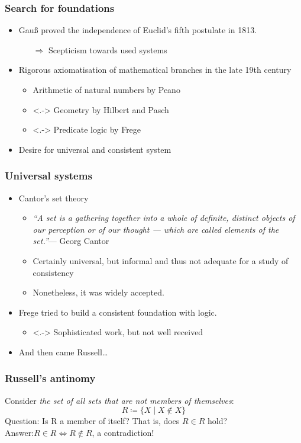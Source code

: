 \documentclass{beamer}
\begin{document}
\begin{frame}
    \frametitle{Search for foundations}
    \begin{itemize}[<+->]
	\item Gauß proved the independence of Euclid's fifth postulate in 1813.
	\begin{itemize}
		\item[$\Rightarrow$] Scepticism towards used systems
	\end{itemize}
	\item Rigorous axiomatisation of mathematical branches in the late 19th century
	\begin{itemize}
		\item Arithmetic of natural numbers by Peano
		\item<.-> Geometry by Hilbert and Pasch
		\item<.-> Predicate logic by Frege
	\end{itemize}
	\item Desire for universal and consistent system
    \end{itemize}
\end{frame}
\begin{frame}
    \frametitle{Universal systems}
    \begin{itemize}[<+->]
	\item Cantor's set theory
	\begin{itemize}
		\item \textit{``A set is a gathering together into a whole of definite, distinct objects of our perception or of our thought --- which are called elements of the set.''}\cite{cantor_set}\hfill--- Georg Cantor
		\item Certainly universal, but informal and thus not adequate for a study of consistency
		\item Nonetheless, it was widely accepted.
	\end{itemize}
	\item Frege tried to build a consistent foundation with logic.
	\begin{itemize}
		\item<.-> Sophisticated work, but not well received
	\end{itemize}
	\item And then came Russell\ldots
    \end{itemize}
\end{frame}
\begin{frame}
    \frametitle{Russell's antinomy}
	Consider \textit{the set of all sets that are not members of themselves}:
	\begin{equation*}
		R\coloneqq\{X\mid X\notin X\}
	\end{equation*}\pause
	Question: Is R a member of itself? That is, does $R\in R$ hold?\pause\\
	\vspace{\baselineskip}
	Answer:\qquad\quad$R\in R \iff R\notin R$, a contradiction!
\end{frame}
\end{document}
